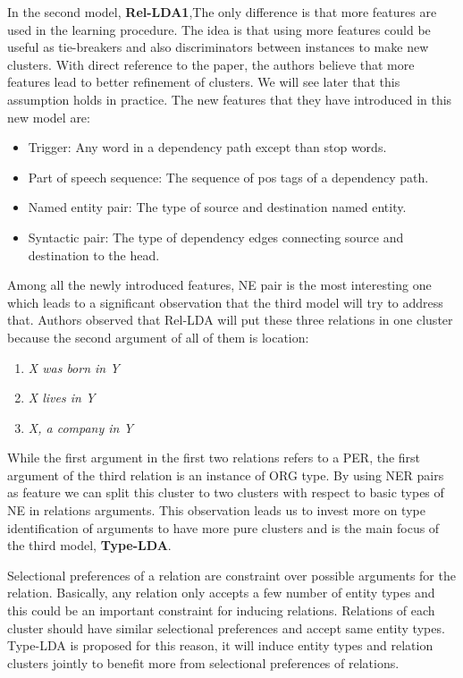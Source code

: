 \documentclass[12pt]{report}
\begin{document}
   	In the second model, \textbf{Rel-LDA1},The only difference is that  more features are used in the learning procedure.
   	 The idea is that using more features could be useful as tie-breakers and also discriminators between instances
   	  to make new clusters. With direct reference to the paper, the authors believe that more features 
   	  lead to better refinement of clusters. We will see later that this assumption holds in practice.
   	   The new features that they have introduced in this new model are:
   	   \begin{itemize}
   	     \item Trigger: Any word in a dependency path except than stop words. 
   	     \item Part of speech sequence: The sequence of pos tags of a dependency path. 
   	     \item Named entity pair: The type of source and destination named entity.
   	     \item Syntactic pair: The type of dependency edges connecting source and destination to the head.
   	   \end{itemize}   
   
 Among all the newly introduced features, NE pair is the most interesting one which leads to a 
 significant observation that the third model will try to address that. Authors observed that 
 Rel-LDA will put these three relations in one cluster because the second argument of all of them is location:
 
 \begin{enumerate}
   \item \emph{ X was born in Y}
   \item \emph{ X lives in Y}
   \item \emph{ X, a company in Y}
 \end{enumerate}
 
 While the first argument in the first two relations refers to a PER, the first argument of the 
 third relation is an instance of ORG type. By using NER pairs as feature we can split this cluster 
 to two clusters with respect to basic types of NE in relations arguments. 
 This observation leads us to invest more on type identification of arguments to have more pure 
 clusters and is the main focus of the third model, \textbf{Type-LDA}.
 
 
 Selectional preferences of a relation are constraint over possible arguments for the relation.
  Basically, any relation only accepts a few number of entity types and this could be an important constraint
   for inducing relations. Relations of each cluster should have similar selectional preferences and
    accept same entity types. Type-LDA is proposed for this reason, it will induce entity types 
    and relation clusters jointly to benefit more from selectional preferences of relations.
    
\end{document}
